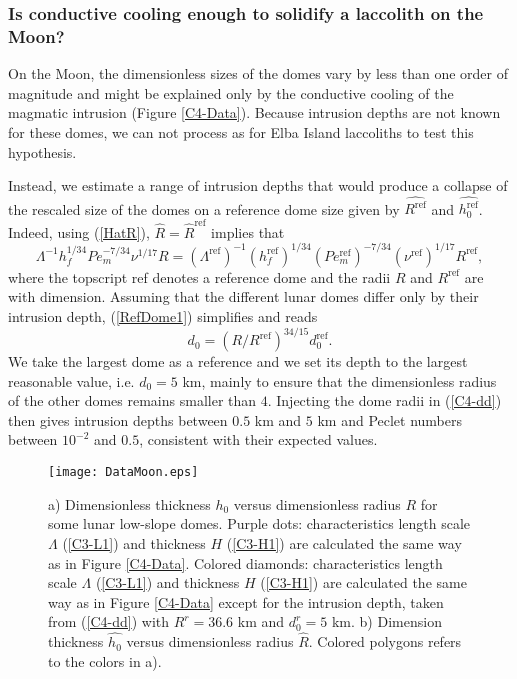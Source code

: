 \subsubsection{Is conductive  cooling enough to solidify  a laccolith
  on the Moon?}
\label{C4-sec:cond-cool-enough}

On the  Moon, the dimensionless sizes  of the domes vary  by less than
one order of  magnitude and might be explained only  by the conductive
cooling  of the  magmatic intrusion  (Figure \ref{C4-Data}).   Because
intrusion depths are not known for  these domes, we can not process as
for Elba Island laccoliths to test this hypothesis.

Instead, we estimate  a range of intrusion depths that  would produce a
collapse of  the rescaled size of  the domes on a  reference dome size
given by $\hat{R^{\text{ref}}}$ and $\hat{h_0^{\text{ref}}}$.  Indeed,
using (\ref{HatR}), $\hat{R}=\hat{R}^{\text{ref}}$ implies that
\begin{equation}
  \Lambda^{-1}h_f^{1/34}Pe_m^{-7/34}\nu^{1/17}R =   \left(\Lambda^{\text{ref}}\right)^{-1}\left(h_f^{\text{ref}}\right)^{1/34}\left(Pe_m^{\text{ref}}\right)^{-7/34}\left(\nu^{\text{ref}}\right)^{1/17}R^{\text{ref}},\label{RefDome1}
\end{equation}
where the topscript ref denotes a reference dome and the radii $R$ and
$R^{\text{ref}}$ are with dimension. Assuming that the different lunar
domes  differ   only  by   their  intrusion   depth,  (\ref{RefDome1})
simplifies and reads
\begin{equation}
  d_0 = \left(R/R^{\text{ref}}\right)^{34/15}d_0^{\text{ref}}.
  \label{C4-dd}
\end{equation}
We take the  largest dome as a  reference and we set its  depth to the
largest reasonable value, i.e.  $d_0=5$  km, mainly to ensure that the
dimensionless  radius of  the other  domes remains  smaller than  $4$.
Injecting the dome radii in  (\ref{C4-dd}) then gives intrusion depths
between $0.5$ km  and $5$ km and Peclet numbers  between $10^{-2}$ and
$0.5$, consistent with their expected values.
\begin{figure}[h!]
  \begin{center}
    \graphicspath{ {/Users/thorey/Documents/These/Projet/Refroidissement/Skin_Model/Figure/Figure_Heating/} }
    \texttt{[image: DataMoon.eps]}
    \caption{  a) Dimensionless  thickness $h_0$  versus dimensionless
      radius  $R$  for  some  lunar  low-slope  domes.   Purple  dots:
      characteristics   length  scale   $\Lambda$  (\ref{C3-L1})   and
      thickness $H$  (\ref{C3-H1}) are calculated  the same way  as in
      Figure \ref{C4-Data}.  Colored  diamonds: characteristics length
      scale  $\Lambda$ (\ref{C3-L1})  and thickness  $H$ (\ref{C3-H1})
      are calculated  the same way  as in Figure  \ref{C4-Data} except
      for  the   intrusion  depth,   taken  from   (\ref{C4-dd})  with
      $R^r  =  36.6$ km  and  $d_0^r=5$  km.  b)  Dimension  thickness
      $\hat{h_0}$  versus  dimensionless  radius  $\hat{R}$.   Colored
      polygons refers to the colors in a).}
    \label{C4-ArrestMoon}
  \end{center}
\end{figure}
